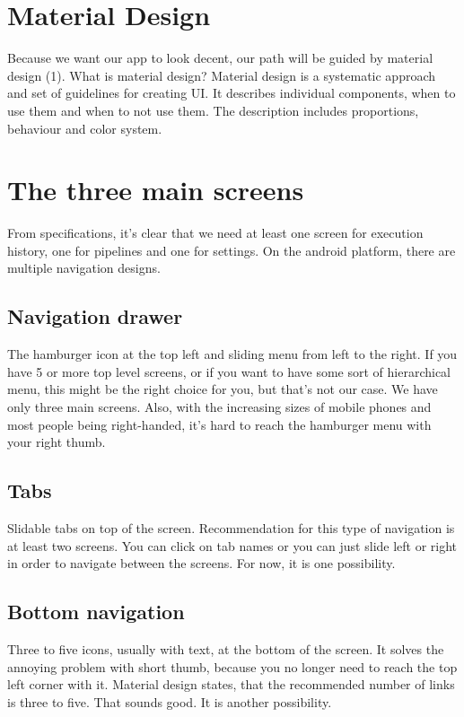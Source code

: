 \section{Material Design}
Because we want our app to look decent, our path will be guided by material design (1).
What is material design?
Material design is a systematic approach and set of guidelines for creating UI.
It describes individual components, when to use them and when to not use them.
The description includes proportions, behaviour and color system.

\section{The three main screens}
From specifications, it's clear that we need at least one screen for execution history, one for pipelines and one for settings.
On the android platform, there are multiple navigation designs.

\subsection{Navigation drawer}
The hamburger icon at the top left and sliding menu from left to the right.
If you have 5 or more top level screens, or if you want to have some sort of hierarchical menu, this might be the right choice for you, but that's not our case. We have only three main screens.
Also, with the increasing sizes of mobile phones and most people being right-handed, it's hard to reach the hamburger menu with your right thumb.

\subsection{Tabs}
Slidable tabs on top of the screen.
Recommendation for this type of navigation is at least two screens.
You can click on tab names or you can just slide left or right in order to navigate between the screens.
For now, it is one possibility.

\subsection{Bottom navigation}
Three to five icons, usually with text, at the bottom of the screen.
It solves the annoying problem with short thumb, because you no longer need to reach the top left corner with it.
Material design states, that the recommended number of links is three to five. That sounds good.
It is another possibility.

